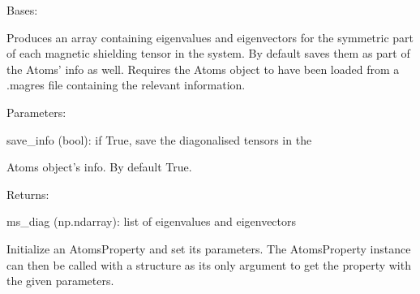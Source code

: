 \documentclass[letterpaper,10pt,english]{sphinxmanual}
\begin{document}
\begin{fulllineitems}
\label{doctree/soprano.properties.nmr.ms:soprano.properties.nmr.ms.MSDiagonal}
Bases: {\hyperref[doctree/soprano.properties.atomsproperty:soprano.properties.atomsproperty.AtomsProperty]{\emph{}}}

Produces an array containing eigenvalues and eigenvectors for the
symmetric part of each magnetic shielding tensor in the system. By default
saves them as part of the Atoms' info as well.
Requires the Atoms object to have been loaded from a .magres file
containing the relevant information.

\begin{DUlineblock}{0em}
\item[] Parameters:
\item[]
\begin{DUlineblock}{\DUlineblockindent}
\item[] save\_info (bool): if True, save the diagonalised tensors in the
\item[]
\begin{DUlineblock}{\DUlineblockindent}
\item[] Atoms object's info. By default True.
\end{DUlineblock}
\end{DUlineblock}
\end{DUlineblock}

\begin{DUlineblock}{0em}
\item[] Returns:
\item[]
\begin{DUlineblock}{\DUlineblockindent}
\item[] ms\_diag (np.ndarray): list of eigenvalues and eigenvectors
\end{DUlineblock}
\end{DUlineblock}

Initialize an AtomsProperty and set its parameters.
The AtomsProperty instance can then be called with a structure as its
only argument to get the property with the given parameters.


\end{fulllineitems}
\end{document}
